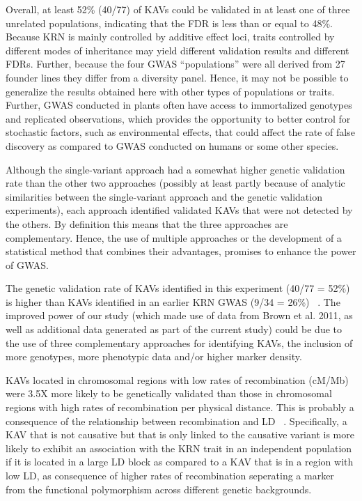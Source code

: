\documentclass[10pt,letterpaper]{article}
\begin{document}
Overall, at least 52\% (40/77) of KAVs could be validated in at least one of three unrelated populations, indicating that the FDR is less than or equal to 48\%. Because KRN is mainly controlled by additive effect loci, traits controlled by different modes of inheritance may yield different validation results and different FDRs. Further, because the four GWAS “populations” were all derived from 27 founder lines they differ from a diversity panel. Hence, it may not be possible to generalize the results obtained here with other types of populations or traits. Further, GWAS conducted in plants often have access to immortalized genotypes and replicated observations, which provides the opportunity to better control for stochastic factors, such as environmental effects, that could affect the rate of false discovery as compared to GWAS conducted on humans or some other species.

Although the single-variant approach had a somewhat higher genetic validation rate than the other two approaches (possibly at least partly because of analytic similarities between the single-variant approach and the genetic validation experiments), each approach identified validated KAVs that were not detected by the others. By definition this means that the three approaches are complementary. Hence, the use of multiple approaches or the development of a statistical method that combines their advantages, promises to enhance the power of GWAS. 

The genetic validation rate of KAVs identified in this experiment (40/77 = 52\%) is higher than KAVs identified in an earlier KRN GWAS (9/34 = 26\%) ~\cite{Brown2011}. The improved power of our study (which made use of data from Brown et al. 2011, as well as additional data generated as part of the current study) could be due to the use of three complementary approaches for identifying KAVs, the inclusion of more genotypes, more phenotypic data and/or higher marker density. 

KAVs located in chromosomal regions with low rates of recombination (cM/Mb) were 3.5X more likely to be genetically validated than those in chromosomal regions with high rates of recombination per physical distance. This is probably a consequence of the relationship between recombination and LD ~\cite{Kim2007}. Specifically, a KAV that is not causative but that is only linked to the causative variant is more likely to exhibit an association with the KRN trait in an independent population if it is located in a large LD block as compared to a KAV that is in a region with low LD, as consequence of higher rates of recombination seperating a marker from the functional polymorphism across different genetic backgrounds.
\end{document}
